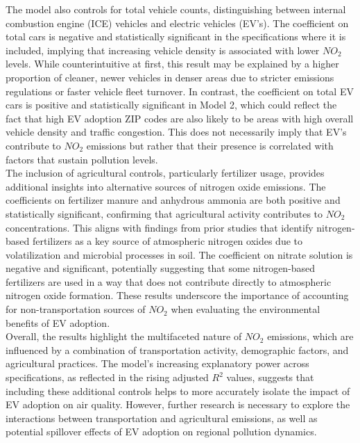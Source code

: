 \documentclass[12pt]{article}
\newcommand\tab[1][.50cm]{\hspace*{#1}}
\begin{document}
\begin{multicols}{2}
		\tab The model also controls for total vehicle counts, distinguishing between internal combustion engine (ICE) vehicles and electric vehicles (EV's). The coefficient on total cars is negative and statistically significant in the specifications where it is included, implying that increasing vehicle density is associated with lower $NO_2$ levels. While counterintuitive at first, this result may be explained by a higher proportion of cleaner, newer vehicles in denser areas due to stricter emissions regulations or faster vehicle fleet turnover. In contrast, the coefficient on total EV cars is positive and statistically significant in Model 2, which could reflect the fact that high EV adoption ZIP codes are also likely to be areas with high overall vehicle density and traffic congestion. This does not necessarily imply that EV's contribute to $NO_2$ emissions but rather that their presence is correlated with factors that sustain pollution levels.\\
		\tab The inclusion of agricultural controls, particularly fertilizer usage, provides additional insights into alternative sources of nitrogen oxide emissions. The coefficients on fertilizer manure and anhydrous ammonia are both positive and statistically significant, confirming that agricultural activity contributes to $NO_2$ concentrations. This aligns with findings from prior studies that identify nitrogen-based fertilizers as a key source of atmospheric nitrogen oxides due to volatilization and microbial processes in soil. The coefficient on nitrate solution is negative and significant, potentially suggesting that some nitrogen-based fertilizers are used in a way that does not contribute directly to atmospheric nitrogen oxide formation. These results underscore the importance of accounting for non-transportation sources of $NO_2$ when evaluating the environmental benefits of EV adoption.\\
		\tab Overall, the results highlight the multifaceted nature of $NO_2$ emissions, which are influenced by a combination of transportation activity, demographic factors, and agricultural practices. The model's increasing explanatory power across specifications, as reflected in the rising adjusted $R^2$ values, suggests that including these additional controls helps to more accurately isolate the impact of EV adoption on air quality. However, further research is necessary to explore the interactions between transportation and agricultural emissions, as well as potential spillover effects of EV adoption on regional pollution dynamics.
		\newpage
		
	\end{multicols}
	
\end{document}
